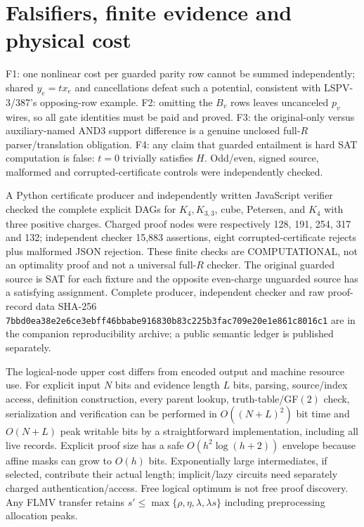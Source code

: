 \documentclass[11pt]{article}
\begin{document}
\section*{Falsifiers, finite evidence and physical cost}
F1: one nonlinear cost per guarded parity row cannot be summed independently; shared $y_e=t x_e$ and cancellations defeat such a potential, consistent with LSPV-3/387's opposing-row example. F2: omitting the $B_v$ rows leaves uncanceled $p_v$ wires, so all gate identities must be paid and proved. F3: the original-only versus auxiliary-named AND3 support difference is a genuine unclosed full-$R$ parser/translation obligation. F4: any claim that guarded entailment is hard SAT computation is false: $t=0$ trivially satisfies $H$. Odd/even, signed source, malformed and corrupted-certificate controls were independently checked.

A Python certificate producer and independently written JavaScript verifier checked the complete explicit DAGs for $K_4,K_{3,3}$, cube, Petersen, and $K_4$ with three positive charges. Charged proof nodes were respectively 128, 191, 254, 317 and 132; independent checker 15,883 assertions, eight corrupted-certificate rejects plus malformed JSON rejection. These finite checks are COMPUTATIONAL, not an optimality proof and not a universal full-$R$ checker. The original guarded source is SAT for each fixture and the opposite even-charge unguarded source has a satisfying assignment. Complete producer, independent checker and raw proof-record data SHA-256 \texttt{7bbd0ea38e2e6ce3ebff46bbabe916830b83c225b3fac709e20e1e861c8016c1} are in the companion reproducibility archive; a public semantic ledger is published separately.

The logical-node upper cost differs from encoded output and machine resource use. For explicit input $N$ bits and evidence length $L$ bits, parsing, source/index access, definition construction, every parent lookup, truth-table/GF$(2)$ check, serialization and verification can be performed in $O((N+L)^2)$ bit time and $O(N+L)$ peak writable bits by a straightforward implementation, including all live records. Explicit proof size has a safe $O(h^2\log(h+2))$ envelope because affine masks can grow to $O(h)$ bits. Exponentially large intermediates, if selected, contribute their actual length; implicit/lazy circuits need separately charged authentication/access. Free logical optimum is not free proof discovery. Any FLMV transfer retains $s'\le\max\{\rho,\eta,\lambda,\lambda s\}$ including preprocessing allocation peaks.
\end{document}
